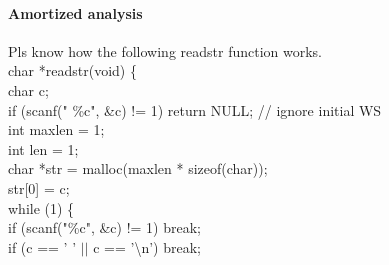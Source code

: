 \documentclass[10pt,letter]{article}
\begin{document}
\paragraph{Amortized analysis} Pls know how the following readstr function works. \\
char *readstr(void) \{\\
\hspace*{5pt} char c;\\ 
\hspace*{5pt} if (scanf(" \%c", \&c) != 1) return NULL; // ignore initial WS\\
\hspace*{5pt} int maxlen = 1;\\
\hspace*{5pt} int len = 1;\\
\hspace*{5pt} char *str = malloc(maxlen * sizeof(char));\\
\hspace*{5pt} str[0] = c;\\
\hspace*{5pt} while (1) \{\\
\hspace*{10pt} if (scanf("\%c", \&c) != 1) break;\\
\hspace*{10pt} if (c == ' ' $||$ c == '\textbackslash n') break;\\
\end{document}
